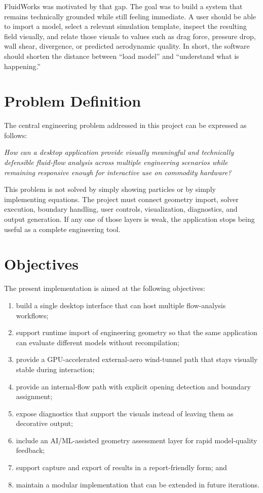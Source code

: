 \documentclass[12pt,a4paper,titlepage]{report}
\begin{document}
FluidWorks was motivated by that gap. The goal was to build a system that remains technically grounded while still feeling immediate. A user should be able to import a model, select a relevant simulation template, inspect the resulting field visually, and relate those visuals to values such as drag force, pressure drop, wall shear, divergence, or predicted aerodynamic quality. In short, the software should shorten the distance between ``load model'' and ``understand what is happening.''

\section{Problem Definition}
The central engineering problem addressed in this project can be expressed as follows:

\textit{How can a desktop application provide visually meaningful and technically defensible fluid-flow analysis across multiple engineering scenarios while remaining responsive enough for interactive use on commodity hardware?}

This problem is not solved by simply showing particles or by simply implementing equations. The project must connect geometry import, solver execution, boundary handling, user controls, visualization, diagnostics, and output generation. If any one of those layers is weak, the application stops being useful as a complete engineering tool.

\section{Objectives}
The present implementation is aimed at the following objectives:
\begin{enumerate}
\item build a single desktop interface that can host multiple flow-analysis workflows;
\item support runtime import of engineering geometry so that the same application can evaluate different models without recompilation;
\item provide a GPU-accelerated external-aero wind-tunnel path that stays visually stable during interaction;
\item provide an internal-flow path with explicit opening detection and boundary assignment;
\item expose diagnostics that support the visuals instead of leaving them as decorative output;
\item include an AI/ML-assisted geometry assessment layer for rapid model-quality feedback;
\item support capture and export of results in a report-friendly form; and
\item maintain a modular implementation that can be extended in future iterations.
\end{enumerate}
\end{document}
